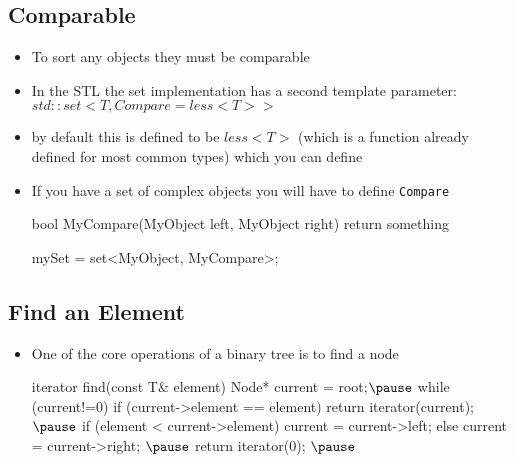 
\begin{slide}
\section[-1]{Comparable}

\begin{PauseHighLight}
  \begin{itemize}
  \item To sort any objects they must be comparable\pause
  \item In the STL the set implementation has a second template
    parameter: \jl$std::set<T, Compare = less<T> >$\pause
  \item by default this is defined to be \jl$less<T>$ (which is a function
    already defined for most common types) which you can define\pause
  \item If you have a set of complex objects you will have to define
    \texttt{Compare}
    \begin{cpp}
      bool MyCompare(MyObject left, MyObject right) {
        return something
      }

      mySet = set<MyObject, MyCompare>;
    \end{cpp}\pause
  \end{itemize}
\end{PauseHighLight}

\end{slide}


\begin{slide}
\section{Find an Element}

\begin{PauseHighLight}
  \begin{itemize}
  \item One of the core operations of a binary tree is to find a node\pause
    \begin{cpp}
   iterator find(const T& element) {
    Node* current = root;$\pause$
    while (current!=0) {
      if (current->element == element) {
	return iterator(current);
      }$\pause$
      if (element < current->element) {
	current = current->left;
      } else {
	current = current->right;
      }$\pause$
    }
    return iterator(0);
  }$\pause$
    \end{cpp}
  \end{itemize}
\end{PauseHighLight}

\end{slide}

